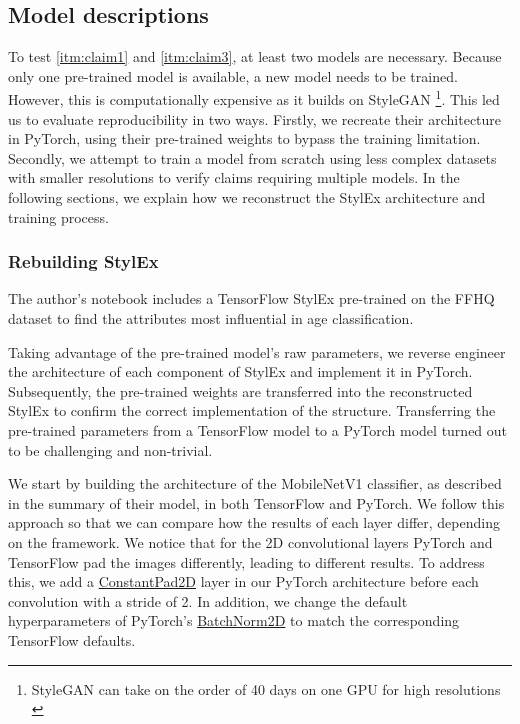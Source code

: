 \subsection{Model descriptions}

To test \ref{itm:claim1} and \ref{itm:claim3}, at least two models are necessary. Because only one pre-trained model is available, a new model needs to be trained. However, this is computationally expensive as it builds on StyleGAN \footnote{StyleGAN can take on the order of 40 days on one GPU for high resolutions \cite{karras2019stylebased}}. This led us to evaluate reproducibility in two ways. Firstly, we recreate their architecture in PyTorch, using their pre-trained weights to bypass the training limitation. Secondly, we attempt to train a model from scratch using less complex datasets with smaller resolutions to verify claims requiring multiple models. In the following sections, we explain how we reconstruct the StylEx architecture and training process.
\subsubsection{Rebuilding StylEx}
 \label{First Approach}
 
The author's notebook includes a TensorFlow StylEx pre-trained on the FFHQ\cite{karras2019stylebased} dataset to find the attributes most influential in age classification. 

Taking advantage of the pre-trained model's raw parameters, we reverse engineer the architecture of each component of StylEx and implement it in PyTorch. Subsequently, the pre-trained weights are transferred into the reconstructed StylEx to confirm the correct implementation of the structure. Transferring the pre-trained parameters from a TensorFlow model to a PyTorch model turned out to be challenging and non-trivial. 

We start by building the architecture of the MobileNetV1 \cite{howard2017mobilenets} classifier, as described in the summary of their model, in both TensorFlow and PyTorch. We follow this approach so that we can compare how the results of each layer differ, depending on the framework. 
We notice that for the 2D convolutional layers PyTorch and TensorFlow pad the images differently, leading to different results. To address this, we add a \href{https://pytorch.org/docs/stable/generated/torch.nn.ConstantPad2d.html}{ConstantPad2D} layer in our PyTorch architecture before each convolution with a stride of 2. In addition, we change the default hyperparameters of PyTorch's \href{https://pytorch.org/docs/stable/generated/torch.nn.BatchNorm2d.html}{BatchNorm2D} to match the corresponding TensorFlow defaults.


